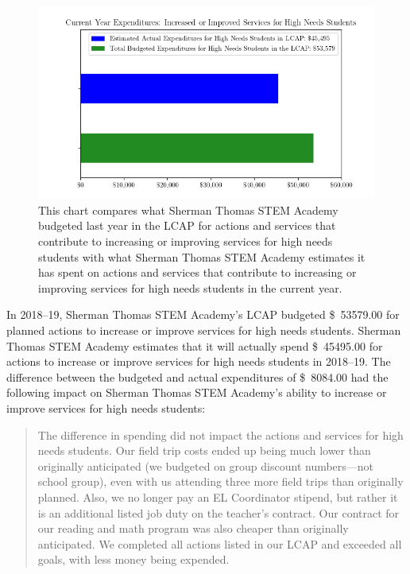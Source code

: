 \documentclass{article}
\newcommand{\dollar}[1]{\SI{#1}[\$]{}}
\newcounter{goal}[section] %
\newcounter{action}[goal]
\begin{document}
\begin{figure}[h!btp]
\centering
\includegraphics[scale=0.8]{serv}
\caption*{This chart compares what Sherman Thomas STEM Academy budgeted last year in the LCAP for actions and services that contribute to increasing or improving services for high needs students with what  Sherman Thomas STEM Academy estimates it has spent on actions and services that contribute to increasing or improving services for high needs students in the current year.}
\end{figure}

In 2018--19, Sherman Thomas STEM Academy's LCAP budgeted \dollar{53579.00} for planned actions to increase or improve services for high needs students. Sherman Thomas STEM Academy estimates that it will actually spend \dollar{45495.00} for actions to increase or improve services for high needs students in 2018--19. The difference between the budgeted and actual expenditures of \dollar{8084.00} had the following impact on Sherman Thomas STEM Academy's ability to increase or improve services for high needs students:
 
\begin{quotation}
The difference in spending did not impact the actions and services for high needs students. Our field trip costs ended up being much lower than originally anticipated (we budgeted on group discount numbers---not school group), even with us attending three more field trips than originally planned. Also, we no longer pay an EL Coordinator stipend, but rather it is an additional listed job duty on the teacher's contract. Our contract for our reading and math program was also cheaper than originally anticipated. We completed all actions listed in our LCAP and exceeded all goals, with less money being expended.
\end{quotation}
\end{document}
